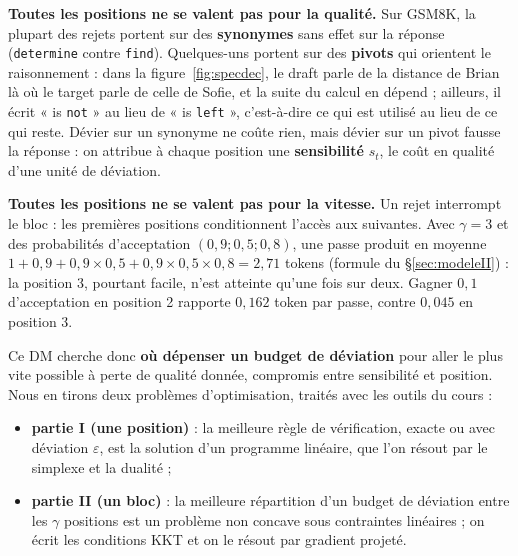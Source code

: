 \documentclass[11pt,a4paper]{article}
\newcommand{\tok}[1]{\texttt{#1}}
\theoremstyle{plain}
\theoremstyle{definition}
\begin{document}
\textbf{Toutes les positions ne se valent pas pour la qualité.}
Sur GSM8K, la plupart des rejets portent sur des \textbf{synonymes} sans effet sur la réponse (\tok{determine} contre \tok{find}).
Quelques-uns portent sur des \textbf{pivots} qui orientent le raisonnement : dans la figure~\ref{fig:specdec}, le draft parle de la distance de Brian là où le target parle de celle de Sofie, et la suite du calcul en dépend ; ailleurs, il écrit « is \tok{not} » au lieu de « is \tok{left} », c'est-à-dire ce qui est utilisé au lieu de ce qui reste.
Dévier sur un synonyme ne coûte rien, mais dévier sur un pivot fausse la réponse : on attribue à chaque position une \textbf{sensibilité} $s_t$, le coût en qualité d'une unité de déviation.

\textbf{Toutes les positions ne se valent pas pour la vitesse.}
Un rejet interrompt le bloc : les premières positions conditionnent l'accès aux suivantes.
Avec $\gamma=3$ et des probabilités d'acceptation $(0{,}9;0{,}5;0{,}8)$, une passe produit en moyenne $1+0{,}9+0{,}9\times0{,}5+0{,}9\times0{,}5\times0{,}8=2{,}71$ tokens (formule du §\ref{sec:modeleII}) : la position 3, pourtant facile, n'est atteinte qu'une fois sur deux.
Gagner $0{,}1$ d'acceptation en position 2 rapporte $0{,}162$ token par passe, contre $0{,}045$ en position 3.

Ce DM cherche donc \textbf{où dépenser un budget de déviation} pour aller le plus vite possible à perte de qualité donnée, compromis entre sensibilité et position.
Nous en tirons deux problèmes d'optimisation, traités avec les outils du cours :
\begin{itemize}
\item \textbf{partie I (une position)} : la meilleure règle de vérification, exacte ou avec déviation $\varepsilon$, est la solution d'un programme linéaire, que l'on résout par le simplexe et la dualité ;
\item \textbf{partie II (un bloc)} : la meilleure répartition d'un budget de déviation entre les $\gamma$ positions est un problème non concave sous contraintes linéaires ; on écrit les conditions KKT et on le résout par gradient projeté.
\end{itemize}
\end{document}
